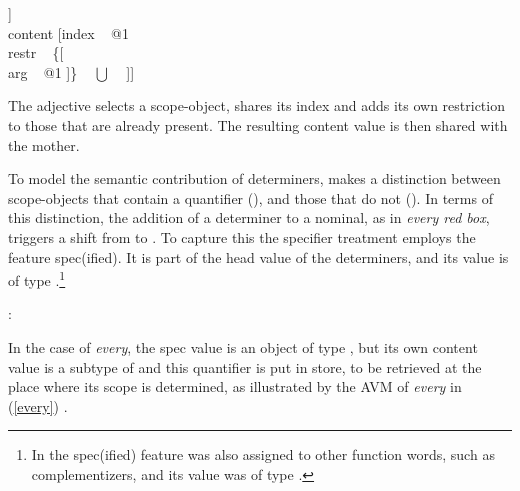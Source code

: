 \documentclass[output=paper]{langsci/langscibook}
\begin{document}
\begin{exe} 
\ex\label{reddd}
\begin{avm}
[cat|head [\type{adjective}                               \\
           mod|loc|content [\type{scope-obj}            \\
                            index ~ @1                   \\
                            restr ~ \avmbox{$\Sigma$} ]] \\
 content [index ~ @1                                     \\
          restr ~ \{[                         \\
                     arg ~ @1 ]\} ~ $\bigcup$ ~ \avmbox{$\Sigma$} ]]
\end{avm}
\end{exe}

\noindent
The adjective selects a scope-object, shares its index and adds its own 
restriction to those that are already present. The resulting {\sc content} 
value is then shared with the mother.

To model the semantic contribution of determiners, \citet{GS00} 
makes a distinction between scope-objects that contain a quantifier 
(), and those that do not (). 
In terms of this distinction, the 
addition of a determiner to a nominal, as in \emph{every red box}, 
triggers a shift from  to . 
To capture this the specifier treatment employs the feature {\sc spec(ified)}. 
It is part of the {\sc head} value of the determiners, and its value is of type 
.\footnote{In \citet[45]{ps2} the {\sc spec(ified)}
feature was also assigned to other function words, such as complementizers, 
and its value was of type .}   

\begin{exe} 
\ex   {}: \begin{avm}  \end{avm}  
\end{exe} 

\noindent
In the case of \emph{every}, the {\sc spec} value is an object of 
type , but its own {\sc content} value is a subtype of 
 and this quantifier is put in store, to be retrieved 
at the place where its scope is determined, as illustrated by the AVM
of \emph{every} in (\ref{every}) \citep[204]{GS00}.  
\end{document}
